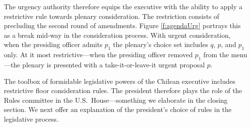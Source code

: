 \documentclass[letter,12pt]{article}
\begin{document}

The urgency authority therefore equips the executive with the ability to apply a restrictive rule towards plenary consideration. The restriction consists of precluding the second round of amendments. Figure \ref{f:agendaUrg} portrays this as a break mid-way in the consideration process. With urgent consideration, when the presiding officer admits $p_1$ the plenary's choice set includes $q$, $p$, and $p_1$ only. At it most restrictive---when the presiding officer removed $p_1$ from the menu---the plenary is presented with a take-it-or-leave-it urgent proposal $p$.

The toolbox of formidable legislative powers of the Chilean executive includes restrictive floor consideration rules. The president therefore plays the role of the Rules committee in the U.S.\ House---something we elaborate in the closing section. We next offer an explanation of the president's choice of rules in the legislative process.
\end{document}
